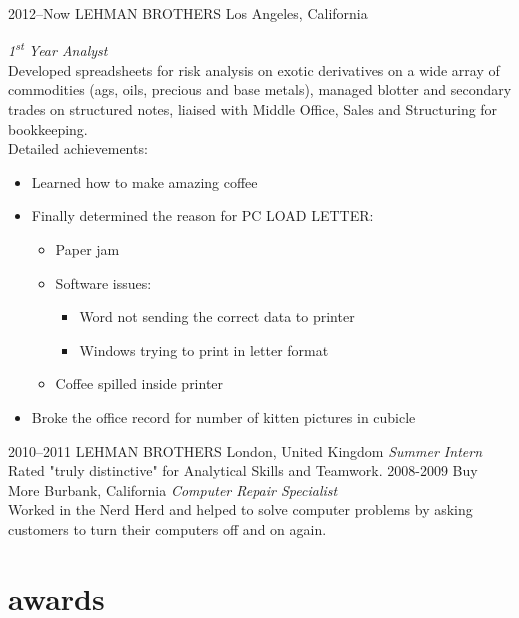 \documentclass[]{friggeri-cv} %
\begin{document}
\begin{entrylist}
\entry
{2012--Now}
{LEHMAN BROTHERS}
{Los Angeles, California}
{\emph{1\textsuperscript{st} Year Analyst} \\
Developed spreadsheets for risk analysis on exotic derivatives on a wide array of commodities (ags, oils, precious and base metals), managed blotter and secondary trades on structured notes, liaised with Middle Office, Sales and Structuring for bookkeeping. \\
Detailed achievements:
\begin{itemize}
\item Learned how to make amazing coffee
\item Finally determined the reason for \textsc{PC LOAD LETTER}:
\begin{itemize}
\item Paper jam
\item Software issues:
\begin{itemize}
\item Word not sending the correct data to printer
\item Windows trying to print in letter format
\end{itemize}
\item Coffee spilled inside printer
\end{itemize}
\item Broke the office record for number of kitten pictures in cubicle
\end{itemize}}
\entry
{2010--2011}
{LEHMAN BROTHERS}
{London, United Kingdom}
{\emph{Summer Intern} \\
Rated "truly distinctive" for Analytical Skills and Teamwork.}
\entry
{2008-2009}
{Buy More}
{Burbank, California}
{\emph{Computer Repair Specialist} \\
Worked in the Nerd Herd and helped to solve computer problems by asking customers to turn their computers off and on again.}
\end{entrylist}


\section{awards}
\end{document}
